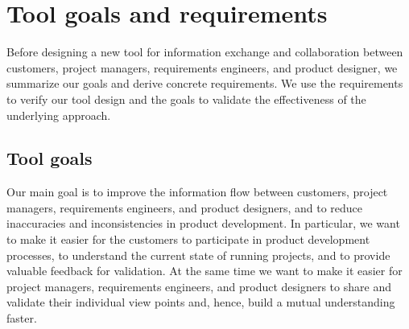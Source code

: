 \section{Tool goals and requirements}
    \label{sec:requirements}
    Before designing a new tool for information exchange and collaboration between customers, project managers, requirements engineers, and product designer, we summarize our goals and derive concrete requirements.
    We use the requirements to verify our tool design and the goals to validate the effectiveness of the underlying approach.

    \subsection*{Tool goals}
    Our main goal is to improve the information flow between customers, project managers, requirements engineers, and product designers, and to reduce inaccuracies and inconsistencies in product development.
    In particular, we want to make it easier for the customers to participate in product development processes, to understand the current state of running projects, and to provide valuable feedback for validation.
    At the same time we want to make it easier for project managers, requirements engineers, and product designers to share and validate their individual view points and, hence, build a mutual understanding faster.

